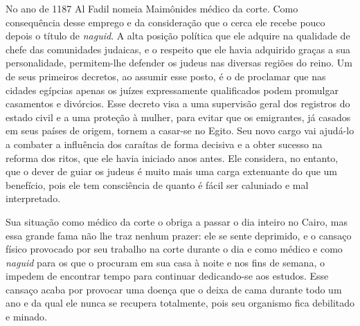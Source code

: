 No ano de 1187 Al Fadil nomeia Maimônides médico da corte. Como
consequência desse emprego e da consideração que o cerca ele recebe
pouco depois o título de \emph{naguid}. A alta posição política que ele adquire
na qualidade de chefe das comunidades judaicas, e o respeito que ele havia
adquirido graças a sua personalidade, permitem-lhe defender os judeus
nas diversas regiões do reino. Um de seus primeiros decretos, ao assumir
esse posto, é o de proclamar que nas cidades egípcias apenas os juízes
expressamente qualificados podem promulgar casamentos e divórcios. Esse
decreto visa a uma supervisão geral dos registros do estado civil e a
uma proteção à mulher, para evitar que os emigrantes, já casados em
seus países de origem, tornem a casar-se no Egito. Seu novo cargo vai
ajudá-lo a combater a influência dos caraítas de forma decisiva e a
obter sucesso na reforma dos ritos, que ele havia iniciado anos antes.
Ele considera, no entanto, que o dever de guiar os judeus é muito mais
uma carga extenuante do que um benefício, pois ele tem consciência de
quanto é fácil ser caluniado e mal interpretado.

Sua situação como médico da corte o obriga a passar o dia inteiro no
Cairo, mas essa grande fama não lhe traz nenhum prazer: ele se sente
deprimido, e o cansaço físico provocado por seu trabalho na corte
durante o dia e como médico e como \emph{naguid} para os que o procuram em sua
casa à noite e nos fins de semana, o impedem de encontrar tempo para
continuar dedicando-se aos estudos. Esse cansaço acaba por provocar uma
doença que o deixa de cama durante todo um ano e da qual ele nunca se
recupera totalmente, pois seu organismo fica debilitado e minado.

